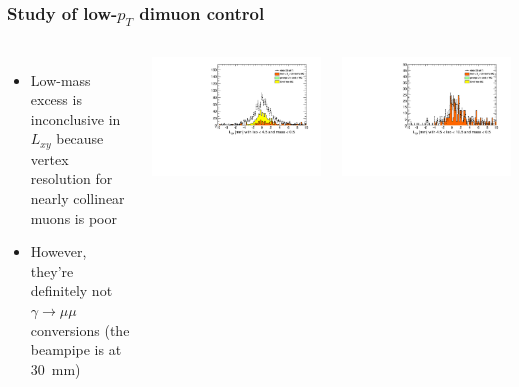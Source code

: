 \documentclass[compress]{beamer}
\begin{document}
\begin{frame}
\frametitle{Study of low-$p_T$ dimuon control}

\begin{columns}
\begin{itemize}
\item Low-mass excess is inconclusive in $L_{xy}$ because vertex
  resolution for nearly collinear muons is poor
\item However, they're definitely not $\gamma \to \mu\mu$ conversions
  (the beampipe is at 30~mm)
\end{itemize}

\includegraphics[width=1.2\linewidth]{lowdimuon_lxy_lowmass_isolated.pdf}

\includegraphics[width=\linewidth]{lowdimuon_lxy_lowmass_isosideband.pdf}


\end{columns}
\end{frame}
\end{document}
